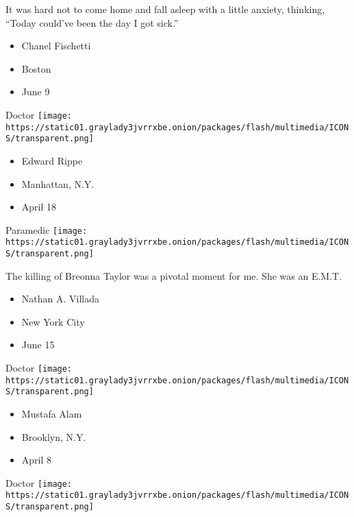 It was hard not to come home and fall asleep with a little anxiety,
thinking, ``Today could've been the day I got sick.''

\begin{itemize}
\tightlist
\item
  Chanel Fischetti
\item
  Boston
\item
  June 9
\end{itemize}

\protect\hyperlink{item-edward-rippe}{}

Doctor
\texttt{[image: https://static01.graylady3jvrrxbe.onion/packages/flash/multimedia/ICONS/transparent.png]}

\begin{itemize}
\tightlist
\item
  Edward Rippe
\item
  Manhattan, N.Y.
\item
  April 18
\end{itemize}

\protect\hyperlink{item-nathan-a-villada}{}

Paramedic
\texttt{[image: https://static01.graylady3jvrrxbe.onion/packages/flash/multimedia/ICONS/transparent.png]}

The killing of Breonna Taylor was a pivotal moment for me. She was an
E.M.T.

\begin{itemize}
\tightlist
\item
  Nathan A. Villada
\item
  New York City
\item
  June 15
\end{itemize}

\protect\hyperlink{item-mustafa-alam}{}

Doctor
\texttt{[image: https://static01.graylady3jvrrxbe.onion/packages/flash/multimedia/ICONS/transparent.png]}

\begin{itemize}
\tightlist
\item
  Mustafa Alam
\item
  Brooklyn, N.Y.
\item
  April 8
\end{itemize}

\protect\hyperlink{item-martynas-gedminas}{}

Doctor
\texttt{[image: https://static01.graylady3jvrrxbe.onion/packages/flash/multimedia/ICONS/transparent.png]}

